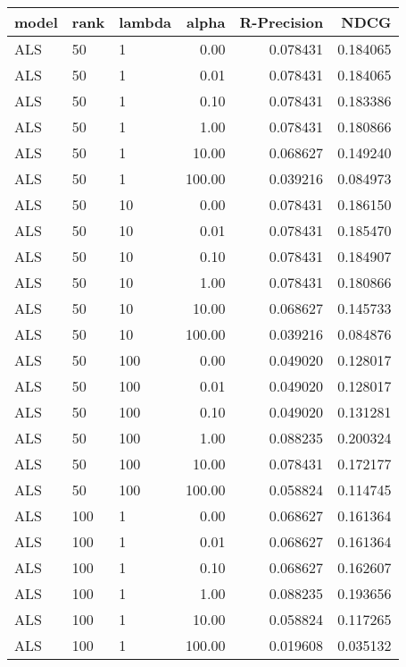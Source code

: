 \begin{tabular}{lllrrr}
\toprule
model & rank & lambda &   alpha &  R-Precision &      NDCG \\
\midrule
  ALS &   50 &      1 &    0.00 &     0.078431 &  0.184065 \\
  ALS &   50 &      1 &    0.01 &     0.078431 &  0.184065 \\
  ALS &   50 &      1 &    0.10 &     0.078431 &  0.183386 \\
  ALS &   50 &      1 &    1.00 &     0.078431 &  0.180866 \\
  ALS &   50 &      1 &   10.00 &     0.068627 &  0.149240 \\
  ALS &   50 &      1 &  100.00 &     0.039216 &  0.084973 \\
  ALS &   50 &     10 &    0.00 &     0.078431 &  0.186150 \\
  ALS &   50 &     10 &    0.01 &     0.078431 &  0.185470 \\
  ALS &   50 &     10 &    0.10 &     0.078431 &  0.184907 \\
  ALS &   50 &     10 &    1.00 &     0.078431 &  0.180866 \\
  ALS &   50 &     10 &   10.00 &     0.068627 &  0.145733 \\
  ALS &   50 &     10 &  100.00 &     0.039216 &  0.084876 \\
  ALS &   50 &    100 &    0.00 &     0.049020 &  0.128017 \\
  ALS &   50 &    100 &    0.01 &     0.049020 &  0.128017 \\
  ALS &   50 &    100 &    0.10 &     0.049020 &  0.131281 \\
  ALS &   50 &    100 &    1.00 &     0.088235 &  0.200324 \\
  ALS &   50 &    100 &   10.00 &     0.078431 &  0.172177 \\
  ALS &   50 &    100 &  100.00 &     0.058824 &  0.114745 \\
  ALS &  100 &      1 &    0.00 &     0.068627 &  0.161364 \\
  ALS &  100 &      1 &    0.01 &     0.068627 &  0.161364 \\
  ALS &  100 &      1 &    0.10 &     0.068627 &  0.162607 \\
  ALS &  100 &      1 &    1.00 &     0.088235 &  0.193656 \\
  ALS &  100 &      1 &   10.00 &     0.058824 &  0.117265 \\
  ALS &  100 &      1 &  100.00 &     0.019608 &  0.035132 \\

\end{tabular}
